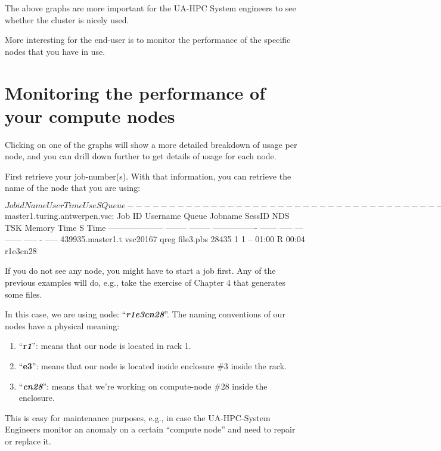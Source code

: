 The above graphs are more important for the UA-HPC System engineers to see whether the cluster is nicely used.

More interesting for the end-user is to monitor the performance of the specific nodes that you have in use.

\section{Monitoring the performance of your compute nodes}

Clicking on one of the graphs will show a more detailed breakdown of usage per node, and you can drill down further to get details of usage for each node.

First retrieve your job-number(s). With that information, you can retrieve the name of the node that you are using:
\begin{prompt}
$ %
Job id                    Name             User            Time Use S Queue
------------------------- ---------------- --------------- -------- - -----
439935.master1             file3.pbs        vsc20167        00:04:45 R qreg

$ %
master1.turing.antwerpen.vsc:
Job ID               Username Queue    Jobname          SessID NDS   TSK Memory Time  S Time
-------------------- -------- -------- ---------------- ------ ----- --- ------ ----- - -----
439935.master1.t     vsc20167 qreg     file3.pbs         28435     1   1    --  01:00 R 00:04
   r1e3cn28
\end{prompt}

If you do not see any node, you might have to start a job first. Any of the previous examples will do, e.g., take the exercise of Chapter 4 that generates some files.


In this case, we are using node: ``\textbf{\textit{r1e3cn28}}''.
The naming conventions of our nodes have a physical meaning:

\begin{enumerate}
\item  ``\textbf{r\textit{1}}'': means that our node is located in rack 1.
\item  ``\textbf{e3}'': means that our node is located inside enclosure \#3 inside the rack.
\item  ``\textbf{\textit{cn28}}'': means that we're working on compute-node \#28 inside the enclosure.
\end{enumerate}

This is easy for maintenance purposes, e.g., in case the UA-HPC-System Engineers monitor an anomaly on a certain ``compute node'' and need to repair or replace it.

